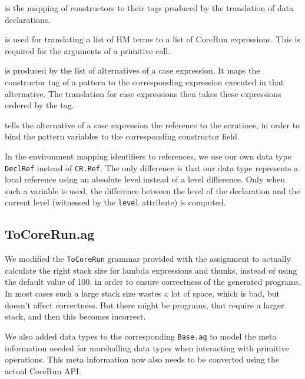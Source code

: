 \documentclass{scrartcl}
\newcommand{\attrdesc}[2]{\texttt{#1}, \emph{#2}}
\begin{document}
\begin{description}[style=multiline,leftmargin=4cm,font=\normalfont]
\item[\attrdesc{conTags :: TagMap}{inherited}] is the mapping of constructors to their tags produced by the translation of data declarations.

\item[\attrdesc{expL :: [CR.Exp]}{synthesized}] is used for translating a list of HM terms to a list of CoreRun expressions. This is required for the arguments of a primitive call.

\item[\attrdesc{altMap :: Map.Map Int CR.Exp}{synthesized}] is produced by the list of alternatives of a case expression. It maps the constructor tag of a pattern to the corresponding expression executed in that alternative.
The translation for case expressions then takes these expressions ordered by the tag.

\item[\attrdesc{scrutRef :: DeclRef}{inherited}] tells the alternative of a case expression the reference to the scrutinee, in order to bind the pattern variables to the corresponding constructor field.

\end{description}

In the environment mapping identifiers to references, we use our own data type \texttt{DeclRef} instead of \texttt{CR.Ref}. The only difference is that our data type represents a local reference using an absolute level instead of a level difference.
Only when such a variable is used, the difference between the level of the declaration and the current level (witnessed by the \texttt{level} attribute) is computed.

\subsection{ToCoreRun.ag}

We modified the \texttt{ToCoreRun} grammar provided with the assignment to actually calculate the right stack size for lambda expressions and thunks, instead of using the default value of 100, in order to ensure correctness of the generated programs.
In most cases such a large stack size wastes a lot of space, which is bad, but doesn't affect correctness. But there might be programs, that require a larger stack, and then this becomes incorrect.

We also added data types to the corresponding \texttt{Base.ag} to model the meta information needed for marshalling data types when interacting with primitive operations.
This meta information now also needs to be converted using the actual CoreRun API.
\end{document}
